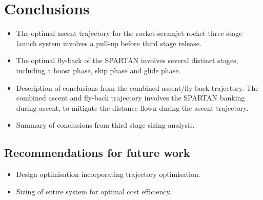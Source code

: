 
\cleardoublepage
\chapter{Conclusions}

\begin{itemize}
	\item The optimal ascent trajectory for the rocket-scramjet-rocket three stage launch system involves a pull-up before third stage release. 
	\item The optimal fly-back of the SPARTAN involves several distinct stages, including a boost phase, skip phase and glide phase. 
	\item Description of conclusions from the combined ascent/fly-back trajectory. The combined ascent and fly-back trajectory involves the SPARTAN banking during ascent, to mitigate the distance flown during the ascent trajectory. 
	\item Summary of conclusions from third stage sizing analysis. 
\end{itemize}

  \section{Recommendations for future work}

\begin{itemize}
	\item Design optimisation incorporating trajectory optimisation.	
	\item Sizing of entire system for optimal cost efficiency. 
\end{itemize}